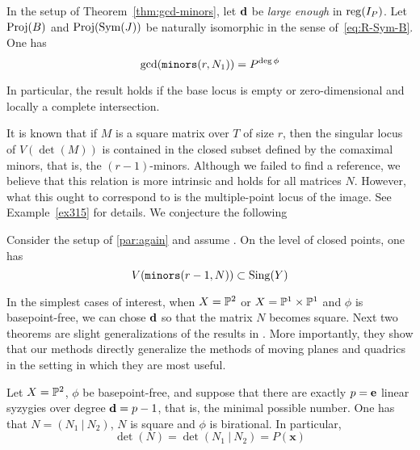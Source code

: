 \documentclass[fleqn,reqno]{amsart}
\numberwithin{first}{chapter}
\begin{document}
\begin{corollary}
\label{cor:approx-complex}
In the setup of Theorem~\ref{thm:gcd-minors}, let $\mathbf d$ be {\em large enough} in $\operatorname{reg}(I_P)$.
Let $\operatorname{Proj}(B)$ and $\operatorname{Proj}(\operatorname{Sym}(J))$ be naturally isomorphic in the sense of~\eqref{eq:R-Sym-B}.
One has
\[
	\gcd(\mathop{\tt minors}(r, N_1))=P^{\deg\phi}
\]

In particular, the result holds if the base locus is empty or
zero-dimensional and locally a complete intersection.
\end{corollary}

\begin{paragraf*}
It is known that if $M$ is a square matrix over $T$ of size $r$,
then the singular locus of $V(\det(M))$ is contained in the closed subset defined by the
comaximal minors, that is, the $(r-1)$-minors.
Although we failed to find a reference,
we believe that this relation is more intrinsic and holds for all matrices $N$.
However, what this ought to correspond to is the multiple-point locus of the image.
See Example~\ref{ex315} for details.
We conjecture the following
\end{paragraf*}

\begin{conjecture}
\label{conj:sing-locus}
Consider the setup of \eqref{par:again} and assume .
On the level of closed points, one has
\[
	V(\mathop{\tt minors}(r-1,N))\subset\mathrm{Sing}(Y)
\]
\end{conjecture}



\begin{paragraf*}
In the simplest cases of interest, when $X=\mathbb{P}^2$ or $X=\mathbb{P}^1\times\mathbb{P}^1$ and $\phi$ is basepoint-free,
we can chose $\mathbf d$ so that the matrix $N$ becomes square.
Next two theorems are slight generalizations of the results in \citet{CGZ-00}.
More importantly, they show that our methods directly generalize the methods of
moving planes and quadrics in the setting in which they are most useful.
\end{paragraf*}

\begin{theorem}
\label{thm:rel-moving-planes-quadrics}
Let $X=\mathbb{P}^2$, $\phi$ be basepoint-free,
and suppose that there are exactly $p=\mathbf e$ linear syzygies over degree $\mathbf d=p-1$,
that is, the minimal possible number.
One has that $N=(N_1~|~N_2)$, $N$ is square and $\phi$ is birational.
In particular,
\[
	\det(N)=\det(N_1~|~N_2)=P(\mathbf x)
\]
\end{theorem}
\end{document}
